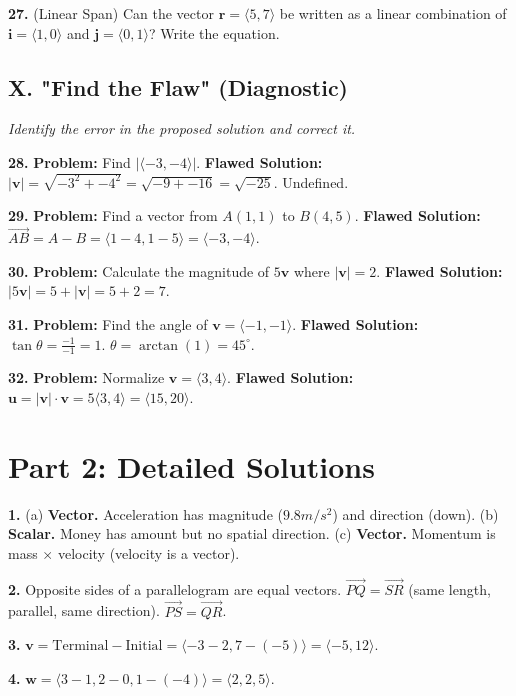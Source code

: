 \documentclass[12pt]{article}
\begin{document}
\textbf{27.} (Linear Span) Can the vector $\mathbf{r} = \langle 5, 7 \rangle$ be written as a linear combination of $\mathbf{i} = \langle 1, 0 \rangle$ and $\mathbf{j} = \langle 0, 1 \rangle$? Write the equation.

\subsection*{X. "Find the Flaw" (Diagnostic)}
\textit{Identify the error in the proposed solution and correct it.}

\textbf{28.} \textbf{Problem:} Find $|\langle -3, -4 \rangle|$.
\textbf{Flawed Solution:} $|\mathbf{v}| = \sqrt{-3^2 + -4^2} = \sqrt{-9 + -16} = \sqrt{-25}$. Undefined.

\textbf{29.} \textbf{Problem:} Find a vector from $A(1,1)$ to $B(4,5)$.
\textbf{Flawed Solution:} $\vec{AB} = A - B = \langle 1-4, 1-5 \rangle = \langle -3, -4 \rangle$.

\textbf{30.} \textbf{Problem:} Calculate the magnitude of $5\mathbf{v}$ where $|\mathbf{v}|=2$.
\textbf{Flawed Solution:} $|5\mathbf{v}| = 5 + |\mathbf{v}| = 5 + 2 = 7$.

\textbf{31.} \textbf{Problem:} Find the angle of $\mathbf{v} = \langle -1, -1 \rangle$.
\textbf{Flawed Solution:} $\tan \theta = \frac{-1}{-1} = 1$. $\theta = \arctan(1) = 45^\circ$.

\textbf{32.} \textbf{Problem:} Normalize $\mathbf{v} = \langle 3, 4 \rangle$.
\textbf{Flawed Solution:} $\mathbf{u} = |\mathbf{v}| \cdot \mathbf{v} = 5 \langle 3, 4 \rangle = \langle 15, 20 \rangle$.

\newpage

\section*{Part 2: Detailed Solutions}

\textbf{1.}
(a) \textbf{Vector.} Acceleration has magnitude ($9.8 m/s^2$) and direction (down).
(b) \textbf{Scalar.} Money has amount but no spatial direction.
(c) \textbf{Vector.} Momentum is mass $\times$ velocity (velocity is a vector).

\textbf{2.} Opposite sides of a parallelogram are equal vectors.
$\vec{PQ} = \vec{SR}$ (same length, parallel, same direction).
$\vec{PS} = \vec{QR}$.

\textbf{3.} $\mathbf{v} = \text{Terminal} - \text{Initial} = \langle -3 - 2, 7 - (-5) \rangle = \langle -5, 12 \rangle$.

\textbf{4.} $\mathbf{w} = \langle 3-1, 2-0, 1-(-4) \rangle = \langle 2, 2, 5 \rangle$.
\end{document}
